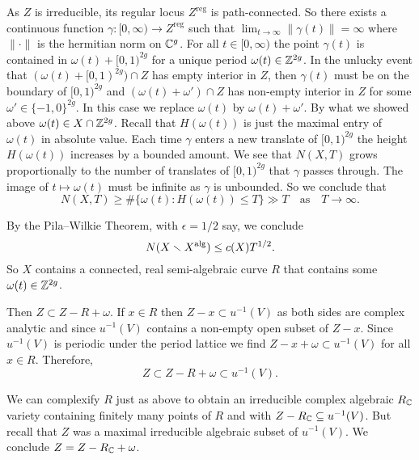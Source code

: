 As $Z$ is irreducible, its regular locus $Z^{\mathrm{reg}}$ is
path-connected. 
So there exists  a continuous function $\gamma : [0,\infty)\rightarrow
Z^{\mathrm{reg}}$ such that $\lim_{t\rightarrow\infty} \|\gamma(t)\| = \infty$
where $\|\cdot\|$ is the hermitian norm on ${\mathbb{C}}^g$. 
For all $t\in [0,\infty)$ the point $\gamma(t)$ is contained in
$\omega(t)+[0,1)^{2g}$ for a unique period $\omega(t)\in{\mathbb{Z}}^{2g}$.
In the unlucky event
that $(\omega(t)+[0,1)^{2g}) \cap Z$ has empty interior
in $Z$, then $\gamma(t)$ must be on the boundary of $[0,1)^{2g}$ and
$(\omega(t)+\omega')\cap Z$ has non-empty interior in $Z$
for some $\omega' \in \{-1,0\}^{2g}$. In this case we replace
$\omega(t)$ by $\omega(t)+\omega'$. 
By
what we showed above $\omega(t)\in X\cap{\mathbb{Z}}^{2g}$.
Recall that $H(\omega(t))$ is
just the maximal entry of $\omega(t)$ in absolute value.
Each time
$\gamma$ enters a new translate of $[0,1)^{2g}$ the height
$H(\omega(t))$ increases by a bounded amount.
We see that $N(X,T)$ grows proportionally to the number of translates of
$[0,1)^{2g}$ that $\gamma$ passes through. The image of $t\mapsto \omega(t)$ must be infinite as $\gamma$ is unbounded. 
So we conclude that
\begin{equation*}
  N(X,T) \ge \# \{\omega(t) : H(\omega(t)) \le T\}  \gg T\quad\text{as}\quad T\rightarrow\infty.
\end{equation*}

By the Pila--Wilkie Theorem, with $\epsilon=1/2$ say, we conclude
$$
N(X\smallsetminus X^{\mathrm{alg}})  \le c(X) T^{1/2}.
$$
So $X$ contains a connected, real semi-algebraic curve $R$ that
contains some $\omega(t)\in{\mathbb{Z}}^{2g}$.


Then $Z\subset Z-R+\omega$. If $x\in R$ then $Z-x\subset u^{-1}(V)$ as
both sides are complex analytic and since $u^{-1}(V)$ contains a
non-empty open subset of $Z-x$. Since $u^{-1}(V)$ is periodic under
the period lattice we find $Z-x+\omega\subset u^{-1}(V)$ for all $x\in
R$. Therefore,
\begin{equation*} Z\subset Z-R+\omega \subset u^{-1}(V).
\end{equation*}

We can complexify $R$ just as above to obtain an irreducible
complex algebraic $R_{\mathbb{C}}$ variety containing finitely many points of
$R$ and with $Z-R_{{\mathbb{C}}} \subseteq u^{-1}(V)$.
But recall that $Z$ was a maximal irreducible algebraic subset of
$u^{-1}(V)$. We conclude $Z = Z - R_{{\mathbb{C}}}+\omega$.


